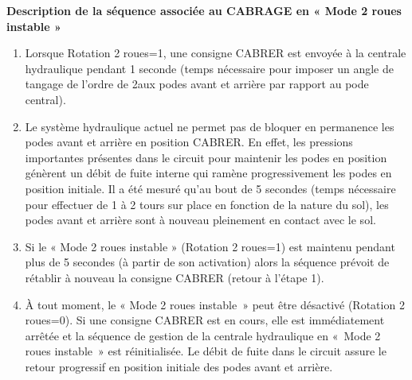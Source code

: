 \textbf{Description de la séquence associée au CABRAGE en « Mode 2 roues instable »}

\begin{enumerate}
\item Lorsque Rotation 2 roues=1, une consigne CABRER est envoyée à la centrale hydraulique pendant 1 seconde (temps nécessaire pour imposer un angle de tangage de l’ordre de 2\ieme aux podes avant et arrière par rapport au pode central).
\item Le système hydraulique actuel ne permet pas de bloquer en permanence les podes avant et arrière en position CABRER. En effet, les pressions importantes présentes dans le circuit pour maintenir les podes en position génèrent un débit de fuite interne qui ramène progressivement les podes en position initiale. Il a été mesuré qu’au bout de 5 secondes (temps nécessaire pour effectuer de 1 à 2 tours sur place en fonction de la nature du sol), les podes avant et arrière sont à nouveau pleinement en contact avec le sol.
\item Si le « Mode 2 roues instable » (Rotation 2 roues=1) est maintenu pendant plus de 5 secondes (à partir de son activation) alors la séquence prévoit de rétablir à nouveau la consigne CABRER (retour à l’étape 1).
\item À tout moment, le « Mode 2 roues instable~» peut être désactivé (Rotation 2 roues=0). Si une consigne CABRER est en cours, elle est immédiatement arrêtée et la séquence de gestion de la centrale hydraulique en «~Mode 2 roues instable~» est réinitialisée. Le débit de fuite dans le circuit assure le retour progressif en
position initiale des podes avant et arrière.
\end{enumerate}
\fi


